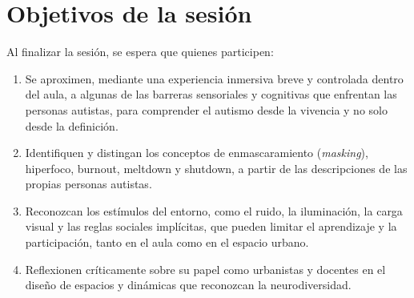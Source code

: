 
\section{Objetivos de la sesión}

Al finalizar la sesión, se espera que quienes participen:

\begin{enumerate}
  \item Se aproximen, mediante una experiencia inmersiva breve y controlada dentro del aula, a algunas de las barreras sensoriales y cognitivas que enfrentan las personas autistas, para comprender el autismo desde la vivencia y no solo desde la definición.
  \item Identifiquen y distingan los conceptos de enmascaramiento (\textit{masking}), hiperfoco, burnout, meltdown y shutdown, a partir de las descripciones de las propias personas autistas.
  \item Reconozcan los estímulos del entorno, como el ruido, la iluminación, la carga visual y las reglas sociales implícitas, que pueden limitar el aprendizaje y la participación, tanto en el aula como en el espacio urbano.
  \item Reflexionen críticamente sobre su papel como urbanistas y docentes en el diseño de espacios y dinámicas que reconozcan la neurodiversidad.
\end{enumerate}
